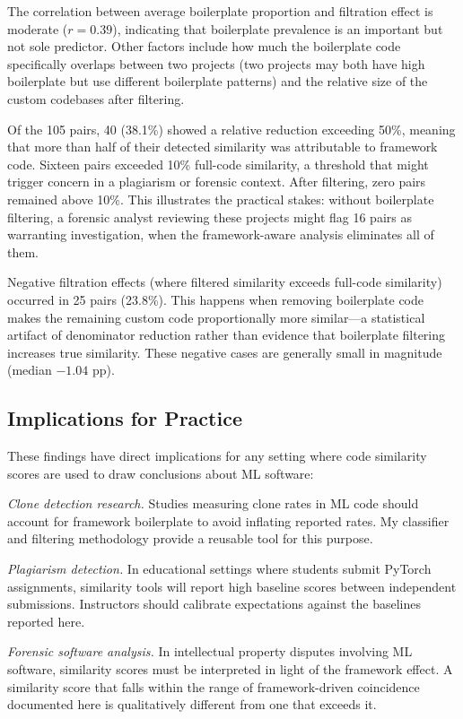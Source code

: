 \documentclass[smallextended,natbib]{svjour3}
\begin{document}
The correlation between average boilerplate proportion and filtration effect is moderate ($r = 0.39$), indicating that boilerplate prevalence is an important but not sole predictor. Other factors include how much the boilerplate code specifically overlaps between two projects (two projects may both have high boilerplate but use different boilerplate patterns) and the relative size of the custom codebases after filtering.

Of the 105 pairs, 40 (38.1\%) showed a relative reduction exceeding 50\%, meaning that more than half of their detected similarity was attributable to framework code. Sixteen pairs exceeded 10\% full-code similarity, a threshold that might trigger concern in a plagiarism or forensic context. After filtering, zero pairs remained above 10\%. This illustrates the practical stakes: without boilerplate filtering, a forensic analyst reviewing these projects might flag 16 pairs as warranting investigation, when the framework-aware analysis eliminates all of them.

Negative filtration effects (where filtered similarity exceeds full-code similarity) occurred in 25 pairs (23.8\%). This happens when removing boilerplate code makes the remaining custom code proportionally more similar---a statistical artifact of denominator reduction rather than evidence that boilerplate filtering increases true similarity. These negative cases are generally small in magnitude (median $-1.04$ pp).

\subsection{Implications for Practice}

These findings have direct implications for any setting where code similarity scores are used to draw conclusions about ML software:

\emph{Clone detection research.} Studies measuring clone rates in ML code should account for framework boilerplate to avoid inflating reported rates. My classifier and filtering methodology provide a reusable tool for this purpose.

\emph{Plagiarism detection.} In educational settings where students submit PyTorch assignments, similarity tools will report high baseline scores between independent submissions. Instructors should calibrate expectations against the baselines reported here.

\emph{Forensic software analysis.} In intellectual property disputes involving ML software, similarity scores must be interpreted in light of the framework effect. A similarity score that falls within the range of framework-driven coincidence documented here is qualitatively different from one that exceeds it.
\end{document}

